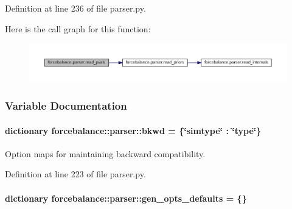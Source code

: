 \-Definition at line 236 of file parser.\-py.



\-Here is the call graph for this function\-:
\nopagebreak
\begin{figure}[H]
\begin{center}
\leavevmode
\includegraphics[width=350pt]{namespaceforcebalance_1_1parser_a56fb1e139dad24bac29f25a3870765ca_cgraph}
\end{center}
\end{figure}




\subsubsection{\-Variable \-Documentation}
\hypertarget{namespaceforcebalance_1_1parser_a37193d7ceabbf07a61e65677372b7dab}{
\paragraph[{bkwd}]{\setlength{\rightskip}{0pt plus 5cm}dictionary {\bf forcebalance\-::parser\-::bkwd} = \{\char`\"{}simtype\char`\"{} \-: \char`\"{}type\char`\"{}\}}}\label{namespaceforcebalance_1_1parser_a37193d7ceabbf07a61e65677372b7dab}


\-Option maps for maintaining backward compatibility. 



\-Definition at line 223 of file parser.\-py.

\hypertarget{namespaceforcebalance_1_1parser_a807ea3a28fedbdfd494f5cc8da063202}{
\paragraph[{gen\-\_\-opts\-\_\-defaults}]{\setlength{\rightskip}{0pt plus 5cm}dictionary {\bf forcebalance\-::parser\-::gen\-\_\-opts\-\_\-defaults} = \{\}}}\label{namespaceforcebalance_1_1parser_a807ea3a28fedbdfd494f5cc8da063202}


